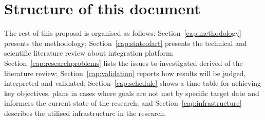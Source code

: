 \section{Structure of this document}  
\noindent

The rest of this proposal is organised as follows: Section~\ref{cap:methodology} presents the methodology; Section~\ref{cap:stateofart} presents the technical and scientific literature review about integration platform; Section~\ref{cap:researchproblems} lists the issues to investigated derived of the literature review; Section~\ref{cap:validation} reports how results will be judged, interpreted and validated; Section~\ref{cap:schedule} shows a time-table for achieving key objectives, plans in cases where goals are not met by specific target date and informers the current state of the research; and Section~\ref{cap:infrastructure} describes the utilised infrastructure in the research.
